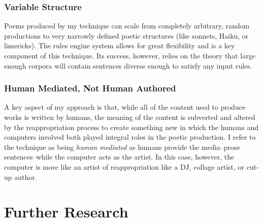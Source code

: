 \documentclass[10pt]{article}
\begin{document}
\subsubsection{Variable Structure}
Poems produced by my technique can scale from completely arbitrary, random
productions to very narrowly defined poetic structures (like sonnets, Haiku, or
limericks). The rules engine system allows for great flexibility and is a key
component of this technique. Its success, however, relies on the theory that
large enough corpora will contain sentences diverse enough to satisfy any input
rules.

\subsubsection{Human Mediated, Not Human Authored}
A key aspect of my approach is that, while all of the content used to produce
works is written by humans, the meaning of the content is subverted and altered
by the reappropriation process to create something new in which the humans and
computers involved both played integral roles in the poetic production. I refer
to the technique as being \emph{human mediated} as humans provide the
media--prose sentences--while the computer acts as the artist. In this case,
however, the computer is more like an artist of reappropriation like a DJ,
collage artist, or cut-up author.

\section{Further Research}



\end{document}
